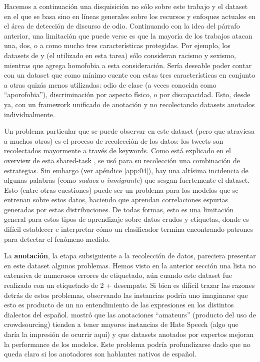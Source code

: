 Hacemos a continuación una disquisición no sólo sobre este trabajo y el dataset en el que se basa sino en líneas generales sobre los recursos y enfoques actuales en el área de detección de discurso de odio. Continuando con la idea del párrafo anterior, una limitación que puede verse es que la mayoría de los trabajos atacan una, dos, o a como mucho tres características protegidas. Por ejemplo, los datasets de \cite{waseem2016hateful} y \cite{hateval2019semeval} (el utilizado en esta tarea) sólo consideran racismo y sexismo, mientras que \citet{Davidson2017AutomatedHS} agrega homofobia a esta consideración. Sería deseable poder contar con un dataset que como mínimo cuente con estas tres características en conjunto a otras quizás menos utilizadas: odio de clase (a veces conocida como ``aporofobia''), discriminación por aspecto físico, o por discapacidad. Esto, desde ya, con un framework unificado de anotación y no recolectando datasets anotados individualmente.

Un problema particular que se puede observar en este dataset (pero que atraviesa a muchos otros) es el proceso de recolección de los datos: los tweets son recolectados mayormente a través de keywords. Como está explicado en el overview de esta shared-task \cite{hateval2019semeval}, se usó para su recolección una combinación de estrategias. Sin embargo (ver apéndice \ref{app:04}), hay una altísima incidencia de algunas palabras (como \emph{sudaca} o \emph{inmigrante}) que sesgan fuertemente el dataset. Esto (entre otras cuestiones) puede ser un problema para los modelos que se entrenan sobre estos datos, haciendo que aprendan correlaciones espurias generadas por estas distribuciones. De todas formas, esto es una limitación general para estos tipos de aprendizaje sobre datos crudos y etiquetas, donde es difícil establecer e interpretar cómo un clasificador termina encontrando patrones para detectar el fenómeno medido.

La \textbf{anotación}, la etapa subsiguiente a la recolección de datos, pareciera presentar en este dataset algunos problemas. Hemos visto en la anterior sección una lista no extensiva de numerosos errores de etiquetado, aún cuando este dataset fue realizado con un etiquetado de 2 + desempate. Si bien es difícil trazar las razones detrás de estos problemas, observando las instancias podría uno imaginarse que esto es producto de un no entendimiento de las expresiones en los distintos dialectos del español. \citet{waseem-2016-racist} mostró que las anotaciones ``amateurs'' (producto del uso de crowdsourcing) tienden a tener mayores instancias de Hate Speech (algo que daría la impresión de ocurrir aquí) y que datasets anotados por expertos mejoran la performance de los modelos. Este problema podría profundizarse dado que no queda claro si los anotadores son hablantes nativos de español.

